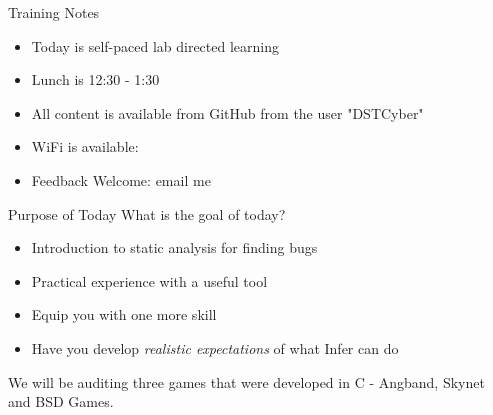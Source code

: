 \documentclass{beamer}
\begin{document}
\begin{frame}{Training Notes}
	\begin{itemize}
		\item Today is self-paced lab directed learning
		\item Lunch is 12:30 - 1:30 
		\item All content is available from GitHub from the user "DSTCyber"
		\item WiFi is available: 
		\item Feedback Welcome: email me 
	\end{itemize}
\end{frame}

\begin{frame}{Purpose of Today}
	What is the goal of today?
	\begin{itemize}
		\item Introduction to static analysis for finding bugs
		\item Practical experience with a useful tool
		\item Equip you with one more skill
		\item Have you develop \textit{realistic expectations} of what Infer can do
	\end{itemize}
	We will be auditing three games that were developed in C - Angband, Skynet and BSD Games.
\end{frame}



\end{document}
